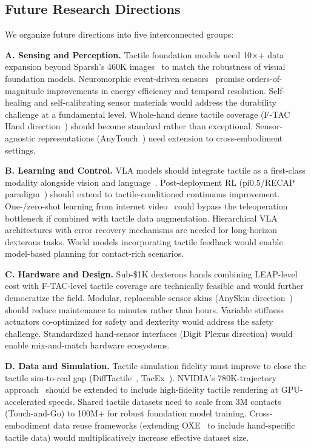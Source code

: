 \subsection{Future Research Directions}

We organize future directions into five interconnected groups:

\textbf{A. Sensing and Perception.} Tactile foundation models need 10$\times$+ data expansion beyond Sparsh's 460K images~\cite{higuera2024sparsh} to match the robustness of visual foundation models. Neuromorphic event-driven sensors~\cite{gao2025nreskin} promise orders-of-magnitude improvements in energy efficiency and temporal resolution. Self-healing and self-calibrating sensor materials would address the durability challenge at a fundamental level. Whole-hand dense tactile coverage (F-TAC Hand direction~\cite{zhao2025ftac}) should become standard rather than exceptional. Sensor-agnostic representations (AnyTouch~\cite{feng2025anytouch}) need extension to cross-embodiment settings.

\textbf{B. Learning and Control.} VLA models should integrate tactile as a first-class modality alongside vision and language~\cite{yu2025forcevla,huang2025tactilevla}. Post-deployment RL (pi0.5/RECAP paradigm~\cite{pi2025recap}) should extend to tactile-conditioned continuous improvement. One-/zero-shot learning from internet video~\cite{liu2025immimic} could bypass the teleoperation bottleneck if combined with tactile data augmentation. Hierarchical VLA architectures with error recovery mechanisms are needed for long-horizon dexterous tasks. World models incorporating tactile feedback would enable model-based planning for contact-rich scenarios.

\textbf{C. Hardware and Design.} Sub-\$1K dexterous hands combining LEAP-level cost with F-TAC-level tactile coverage are technically feasible and would further democratize the field. Modular, replaceable sensor skins (AnySkin direction~\cite{bhirangi2024anyskin}) should reduce maintenance to minutes rather than hours. Variable stiffness actuators co-optimized for safety and dexterity would address the safety challenge. Standardized hand-sensor interfaces (Digit Plexus direction) would enable mix-and-match hardware ecosystems.

\textbf{D. Data and Simulation.} Tactile simulation fidelity must improve to close the tactile sim-to-real gap (DiffTactile~\cite{si2024difftactile}, TacEx~\cite{various2024tacex}). NVIDIA's 780K-trajectory approach~\cite{nvidia2025synthetic} should be extended to include high-fidelity tactile rendering at GPU-accelerated speeds. Shared tactile datasets need to scale from 3M contacts (Touch-and-Go) to 100M+ for robust foundation model training. Cross-embodiment data reuse frameworks (extending OXE~\cite{oxe2024} to include hand-specific tactile data) would multiplicatively increase effective dataset size.

